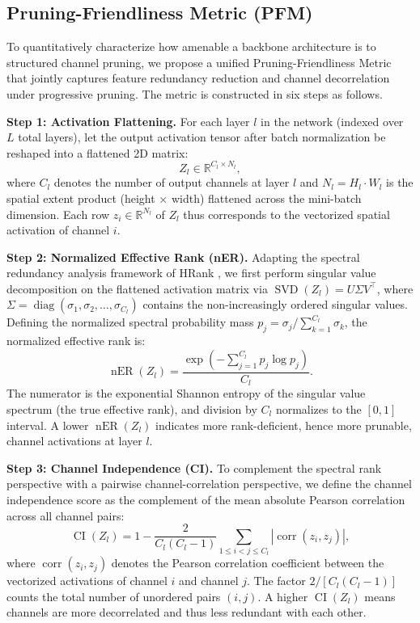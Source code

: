 ﻿\documentclass[conference]{IEEEtran}
\begin{document}
\subsection{Pruning-Friendliness Metric (PFM)}
To quantitatively characterize how amenable a backbone architecture is to structured channel pruning, we propose a unified Pruning-Friendliness Metric that jointly captures feature redundancy reduction and channel decorrelation under progressive pruning. The metric is constructed in six steps as follows.

\textbf{Step 1: Activation Flattening.} For each layer $l$ in the network (indexed over $L$ total layers), let the output activation tensor after batch normalization be reshaped into a flattened 2D matrix:
\begin{equation}
Z_l \in \mathbb{R}^{C_l \times N_l},
\end{equation}
where $C_l$ denotes the number of output channels at layer $l$ and $N_l = H_l \cdot W_l$ is the spatial extent product (height $\times$ width) flattened across the mini-batch dimension. Each row $z_i \in \mathbb{R}^{N_l}$ of $Z_l$ thus corresponds to the vectorized spatial activation of channel $i$.

\textbf{Step 2: Normalized Effective Rank (nER).} Adapting the spectral redundancy analysis framework of HRank \cite{lin2020hrank}, we first perform singular value decomposition on the flattened activation matrix via $\operatorname{SVD}(Z_l) = U \Sigma V^\top$, where $\Sigma = \operatorname{diag}(\sigma_1, \sigma_2, \ldots, \sigma_{C_l})$ contains the non-increasingly ordered singular values. Defining the normalized spectral probability mass $p_j = \sigma_j / \sum_{k=1}^{C_l} \sigma_k$, the normalized effective rank is:
\begin{equation}
\operatorname{nER}(Z_l) = \frac{\exp\left(-\sum_{j=1}^{C_l} p_j \log p_j\right)}{C_l}.
\end{equation}
The numerator is the exponential Shannon entropy of the singular value spectrum (the true effective rank), and division by $C_l$ normalizes to the $[0, 1]$ interval. A lower $\operatorname{nER}(Z_l)$ indicates more rank-deficient, hence more prunable, channel activations at layer $l$.

\textbf{Step 3: Channel Independence (CI).} To complement the spectral rank perspective with a pairwise channel-correlation perspective, we define the channel independence score as the complement of the mean absolute Pearson correlation across all channel pairs:
\begin{equation}
\operatorname{CI}(Z_l) = 1 - \frac{2}{C_l(C_l - 1)} \sum_{1 \leq i < j \leq C_l} \left| \operatorname{corr}(z_i, z_j) \right|,
\end{equation}
where $\operatorname{corr}(z_i, z_j)$ denotes the Pearson correlation coefficient between the vectorized activations of channel $i$ and channel $j$. The factor $2/[C_l(C_l-1)]$ counts the total number of unordered pairs $(i,j)$. A higher $\operatorname{CI}(Z_l)$ means channels are more decorrelated and thus less redundant with each other.
\end{document}
